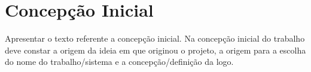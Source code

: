 \section{Concepção Inicial}

Apresentar o texto referente a concepção inicial. Na concepção inicial do trabalho deve constar a origem da ideia em que originou o projeto, a origem para a escolha do nome do trabalho/sistema e a concepção/definição da logo.